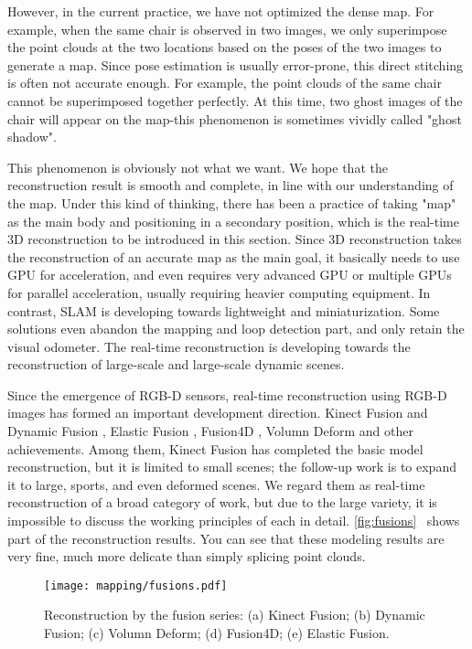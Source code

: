 However, in the current practice, we have not optimized the dense map. For example, when the same chair is observed in two images, we only superimpose the point clouds at the two locations based on the poses of the two images to generate a map. Since pose estimation is usually error-prone, this direct stitching is often not accurate enough. For example, the point clouds of the same chair cannot be superimposed together perfectly. At this time, two ghost images of the chair will appear on the map-this phenomenon is sometimes vividly called "ghost shadow".

This phenomenon is obviously not what we want. We hope that the reconstruction result is smooth and complete, in line with our understanding of the map. Under this kind of thinking, there has been a practice of taking "map" as the main body and positioning in a secondary position, which is the real-time 3D reconstruction to be introduced in this section. Since 3D reconstruction takes the reconstruction of an accurate map as the main goal, it basically needs to use GPU for acceleration, and even requires very advanced GPU or multiple GPUs for parallel acceleration, usually requiring heavier computing equipment. In contrast, SLAM is developing towards lightweight and miniaturization. Some solutions even abandon the mapping and loop detection part, and only retain the visual odometer. The real-time reconstruction is developing towards the reconstruction of large-scale and large-scale dynamic scenes.

Since the emergence of RGB-D sensors, real-time reconstruction using RGB-D images has formed an important development direction. Kinect Fusion {\cite{Newcombe2011}} and Dynamic Fusion {\cite{Newcombe2015}} , Elastic Fusion {\cite{Whelan2015}}, Fusion4D {\cite{Dou2016}}, Volumn Deform {\cite{Innmann2016}} and other achievements. Among them, Kinect Fusion has completed the basic model reconstruction, but it is limited to small scenes; the follow-up work is to expand it to large, sports, and even deformed scenes. We regard them as real-time reconstruction of a broad category of work, but due to the large variety, it is impossible to discuss the working principles of each in detail. \autoref{fig:fusions}~ shows part of the reconstruction results. You can see that these modeling results are very fine, much more delicate than simply splicing point clouds.

\begin{figure}[!htp]
	\centering
	\texttt{[image: mapping/fusions.pdf]}
	\caption{Reconstruction by the fusion series: (a) Kinect Fusion; (b) Dynamic Fusion; (c) Volumn Deform; (d) Fusion4D; (e) Elastic Fusion.}
	\label{fig:fusions}
\end{figure}

